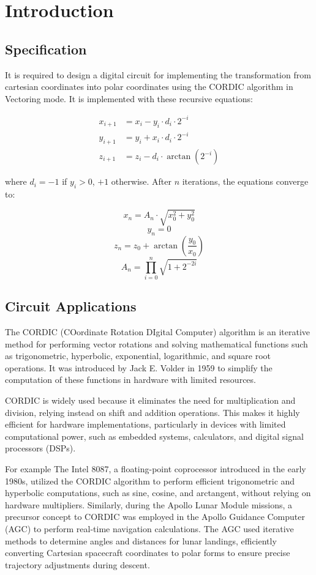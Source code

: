 \chapter{Introduction}

\section{Specification}

It is required to design a digital circuit for implementing the transformation from cartesian coordinates into polar coordinates using the CORDIC algorithm in Vectoring mode. It is implemented
with these recursive equations:

\begin{align*}
    x_{i+1} & = x_i - y_i \cdot d_i \cdot 2^{-i} \\
    y_{i+1} & = y_i + x_i \cdot d_i \cdot 2^{-i} \\
    z_{i+1} & = z_i - d_i \cdot \arctan(2^{-i})
\end{align*}

where \(d_i = -1\) if \(y_i > 0\), \(+1\) otherwise. After \(n\) iterations, the equations converge to:

\[
    x_n = A_n \cdot \sqrt{x_0^2 + y_0^2}
\]
\[
    y_n = 0
\]
\[
    z_n = z_0 + \arctan\left(\frac{y_0}{x_0}\right)
\]
\[
    A_n = \prod_{i=0}^n \sqrt{1 + 2^{-2i}}
\]


\section{Circuit Applications}
The CORDIC (COordinate Rotation DIgital Computer) algorithm is an iterative method for performing vector rotations and 
solving mathematical functions such as trigonometric, hyperbolic, exponential, logarithmic, and square root operations. 
It was introduced by Jack E. Volder in 1959 to simplify the computation of these functions in hardware with limited resources.

CORDIC is widely used because it eliminates the need for multiplication and division, relying instead on shift and addition operations. 
This makes it highly efficient for hardware implementations, particularly in devices with limited computational power, 
such as embedded systems, calculators, and digital signal processors (DSPs).

For example The Intel 8087, a floating-point coprocessor introduced in the early 1980s, utilized the CORDIC algorithm to perform 
efficient trigonometric and hyperbolic computations, such as sine, cosine, and arctangent, without relying on hardware multipliers.
Similarly, during the Apollo Lunar Module missions, a precursor concept to CORDIC was employed in the Apollo Guidance Computer (AGC) 
to perform real-time navigation calculations. The AGC used iterative methods to determine angles and distances for lunar landings, 
efficiently converting Cartesian spacecraft coordinates to polar forms to ensure precise trajectory adjustments during descent.

